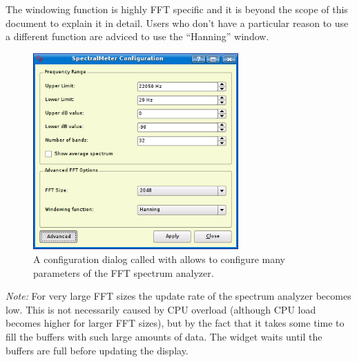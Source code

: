 The windowing function is highly FFT specific and it is beyond the scope of this document to explain it in detail. Users who don't have a particular reason to use a different function are adviced to use the ``Hanning'' window.

\begin{figure}
	\centering
	\includegraphics[width=0.7\textwidth]{images/fft3}
	\caption{A configuration dialog called with  allows to configure many parameters of the FFT spectrum analyzer.}
	\label{fig_fft3}
\end{figure}

\emph{Note:} For very large FFT sizes the update rate of the spectrum analyzer becomes low. This is not necessarily caused by CPU overload (although CPU load becomes higher for larger FFT sizes), but by the fact that it takes some time to fill the buffers with such large amounts of data. The widget waits until the buffers are full before updating the display.


